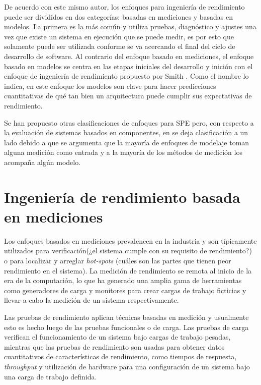 \documentclass[11pt, twoside]{report}
\begin{document}
De acuerdo con este mismo autor, los enfoques para ingeniería de rendimiento puede ser divididos en dos categorías: basadas en mediciones y basadas en modelos. La primera es la más común y utiliza pruebas, diagnóstico y ajustes una vez que existe un sistema en ejecución que se puede medir, es por esto que solamente puede ser utilizada conforme se va acercando el final del ciclo de desarrollo de software. Al contrario del enfoque basado en mediciones, el enfoque basado en modelos se centra en las etapas iniciales del desarrollo y inición con el enfoque de ingeniería de rendimiento propuesto por Smith \cite{thijmen-thesis}. Como el nombre lo indica, en este enfoque los modelos son clave para hacer predicciones cuantitativas de qué tan bien un arquitectura puede cumplir sus expectativas de rendimiento.

Se han propuesto otras clasificaciones de enfoques para SPE pero, con respecto a la evaluación de sistemas basados en componentes, en \cite{performance-model-survey} se deja clasificación a un lado debido a que se argumenta que la mayoría de enfoques de modelaje toman alguna medición como entrada y a la mayoría de los métodos de medición los acompaña algún modelo.


\section{Ingeniería de rendimiento basada en mediciones}
Los enfoques basados en mediciones prevalencen en la industria\cite{thijmen-thesis} y son típicamente utilizados para verificación(¿el sistema cumple con su requisito de rendimiento?) o para localizar y arreglar \emph{hot-spots} (cuáles son las partes que tienen peor rendimiento en el sistema). La medición de rendimiento se remota al inicio de la era de la computación, lo que ha generado una amplia gama de herramientas como generadores de carga y monitores para crear cargas de trabajo ficticias y llevar a cabo la medición de un sistema respectivamente.

Las pruebas de rendimiento aplican técnicas basadas en medición y usualmente esto es hecho luego de las pruebas funcionales o de carga. Las pruebas de carga verifican el funcionamiento de un sistema bajo cargas de trabajo pesadas, mientras que las pruebas de rendimiento son usadas para obtener datos cuantitativos de características de rendimiento, como tiempos de respuesta, \emph{throughput} y utilización de hardware para una configuración de un sistema bajo una carga de trabajo definida.
\end{document}
